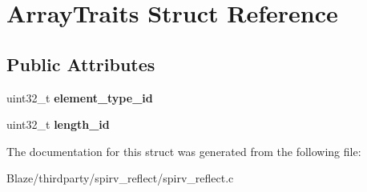 \hypertarget{structArrayTraits}{}\section{Array\+Traits Struct Reference}
\label{structArrayTraits}
\subsection*{Public Attributes}
\begin{DoxyCompactItemize}
\item 
\mbox{\label{structArrayTraits_a7bdcb4397ff6dc6886c1ba038b5103ed}} 
uint32\+\_\+t {\bfseries element\+\_\+type\+\_\+id}
\item 
\mbox{\label{structArrayTraits_a4f32cc72f6e1ff6f4088a973da7b273d}} 
uint32\+\_\+t {\bfseries length\+\_\+id}
\end{DoxyCompactItemize}


The documentation for this struct was generated from the following file\+:\begin{DoxyCompactItemize}
\item 
Blaze/thirdparty/spirv\+\_\+reflect/spirv\+\_\+reflect.\+c\end{DoxyCompactItemize}
